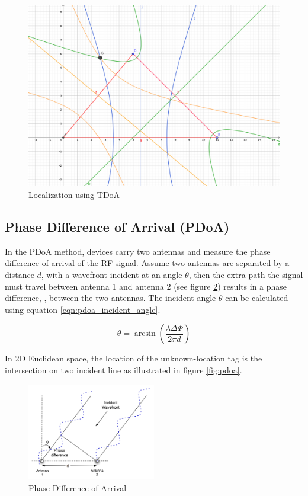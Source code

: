 \documentclass[\main/thesis.tex]{subfiles}
\begin{document}
\begin{figure}[H]
    \centering
    \includegraphics[width=1\textwidth]{tdoa.png}
    \caption{Localization using TDoA}
    \label{fig:tdoa}
\end{figure}

\subsection{Phase Difference of Arrival (PDoA)}
In the PDoA method, devices carry two antennas and measure the phase difference of arrival of the RF signal. Assume two antennas are separated by a distance $d$, with a wavefront incident at an angle $\theta$, then the extra path the signal must travel between antenna 1 and antenna 2 (see figure \ref{fig:PhaseInterferometry}) results in a phase difference, \Delta\Phi, between the two antennas. The incident angle $\theta$ can be calculated using equation \ref{eqn:pdoa_incident_angle}.

\begin{equation}
    \theta = \arcsin(\frac{\lambda\Delta\Phi}{2\pi d})
    \label{eqn:pdoa_incident_angle}
\end{equation}

In 2D Euclidean space, the location of the unknown-location tag is the intersection on two incident line as illustrated in figure \ref{fig:pdoa}.
\begin{figure}[H]
    \centering
    \includegraphics[width=0.5\textwidth]{PhaseInterferometry.png}
    \caption{Phase Difference of Arrival}
    \label{fig:PhaseInterferometry}
\end{figure}
\end{document}

